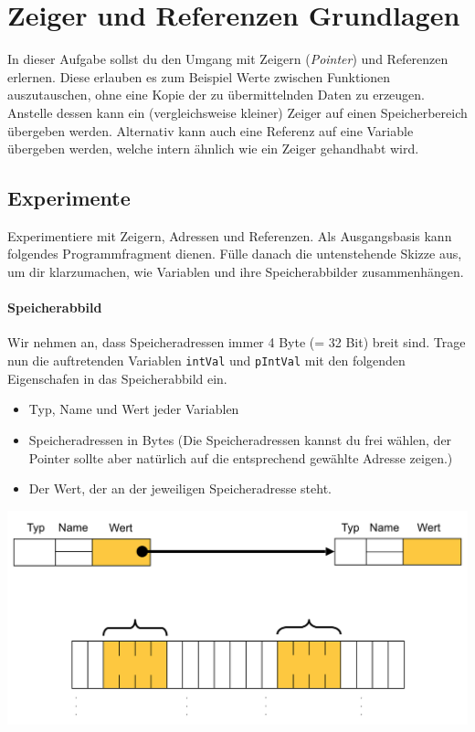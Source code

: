 \section{\ExercisePrefixMemory Zeiger und Referenzen Grundlagen}
\label{sec:pointers}
In dieser Aufgabe sollst du den Umgang mit Zeigern (\emph{Pointer}) und Referenzen erlernen.
Diese erlauben es zum Beispiel Werte zwischen Funktionen auszutauschen, ohne eine Kopie der zu übermittelnden Daten zu erzeugen.
Anstelle dessen kann ein (vergleichsweise kleiner) Zeiger auf einen Speicherbereich übergeben werden.
Alternativ kann auch eine Referenz auf eine Variable übergeben werden, welche intern ähnlich wie ein Zeiger gehandhabt wird.

\subsection{Experimente}
Experimentiere mit Zeigern, Adressen und Referenzen. Als Ausgangsbasis kann folgendes Programmfragment dienen.
Fülle danach die untenstehende Skizze aus, um dir klarzumachen, wie Variablen und ihre Speicherabbilder zusammenhängen.


\paragraph{Speicherabbild}
Wir nehmen an, dass Speicheradressen immer 4 Byte (= 32 Bit) breit sind. 
Trage nun die auftretenden Variablen \lstinline{intVal} und \lstinline{pIntVal} mit den folgenden Eigenschafen in das Speicherabbild ein.
\begin{itemize}
	\item Typ, Name und Wert jeder Variablen
	\item Speicheradressen in Bytes (Die Speicheradressen kannst du frei wählen, der Pointer sollte aber natürlich auf die entsprechend gewählte Adresse zeigen.)
	\item Der Wert, der an der jeweiligen Speicheradresse steht.
\end{itemize}

\begin{center}
\includegraphics[width=.9\textwidth]{02_memory/figures/memory_image.png}
\end{center}

